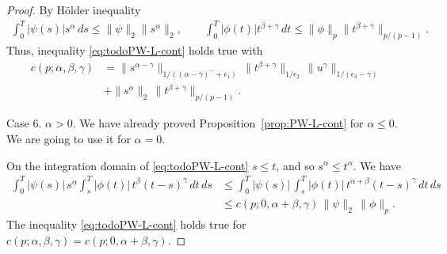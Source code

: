 \documentclass{article}
\theoremstyle{plain}
\theoremstyle{remark}
\theoremstyle{definition}
\begin{document}
\begin{proof}
By H\"older inequality
\begin{gather*}
\int_0^T |\psi(s)| s^\alpha \, ds \le
\|\psi\|_2  \|s^\alpha\|_2,
\qquad
\int_0^T |\phi(t)| t^{\beta+\gamma} \, dt \le
\|\phi\|_p  \|t^{\beta+\gamma}\|_{p/(p-1)}.
\end{gather*}
Thus, inequality \eqref{eq:todoPW-L-cont}
holds true with
\begin{align*}
c(p;\alpha,\beta,\gamma)
&=
\|s^{\alpha-\gamma}\|_{1/((\alpha-\gamma)^- + \epsilon_1)} \,
\|t^{\beta+\gamma}\|_{1/\epsilon_2} \,
\|u^\gamma\|_{1/(\epsilon_3-\gamma)}
\\ &+
\|s^\alpha\|_2 \,
\|t^{\beta+\gamma}\|_{p/(p-1)}.
\end{align*}

Case 6.
$\alpha > 0$.
We have already proved Proposition~\ref{prop:PW-L-cont}
for $\alpha\le 0$.  We are going
to use it for $\alpha=0$.

On the integration domain of
\eqref{eq:todoPW-L-cont} $s\le t$,
and so $s^\alpha \le t^\alpha$.
We have
	\begin{align*}
		\int_0^T |\psi(s)|\, s^\alpha
		\int_s^T |\phi(t)|\, t^\beta (t{-}s)^\gamma
		\, dt \, ds &\le
		\int_0^T |\psi(s)|\,
		\int_s^T |\phi(t)|\, t^{\alpha+\beta} (t{-}s)^\gamma
		\, dt \, ds
\\ & \le
		c(p; 0, \alpha{+}\beta, \gamma) \, \|\psi\|_2 \, \|\phi\|_p.
	\end{align*}
The inequality \eqref{eq:todoPW-L-cont}
holds true for
$c(p; \alpha, \beta,\gamma) = c(p; 0, \alpha{+}\beta, \gamma)$.
\end{proof}

 
\end{document}
